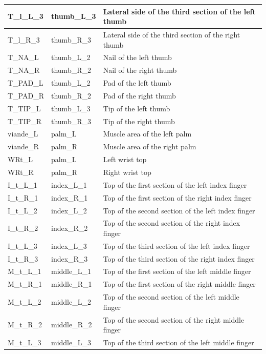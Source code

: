 \documentclass[../main.tex]{subfiles}
\begin{document}
\begin{longtable}{|p{2cm}|p{3cm}|p{5cm}|}
    T\_l\_L\_3 & thumb\_L\_3 & Lateral side of the third section of the left thumb \\ \hline
    T\_l\_R\_3 & thumb\_R\_3 & Lateral side of the third section of the right thumb \\ \hline
    T\_NA\_L & thumb\_L\_2 & Nail of the left thumb \\ \hline
    T\_NA\_R & thumb\_R\_2 & Nail of the right thumb \\ \hline
    T\_PAD\_L & thumb\_L\_2 & Pad of the left thumb \\ \hline
    T\_PAD\_R & thumb\_R\_2 & Pad of the right thumb \\ \hline
    T\_TIP\_L & thumb\_L\_3 & Tip of the left thumb \\ \hline
    T\_TIP\_R & thumb\_R\_3 & Tip of the right thumb \\ \hline
    viande\_L & palm\_L & Muscle area of the left palm \\ \hline
    viande\_R & palm\_R & Muscle area of the right palm \\ \hline
    WRt\_L & palm\_L & Left wrist top \\ \hline
    WRt\_R & palm\_R & Right wrist top \\ \hline
    I\_t\_L\_1 & index\_L\_1 & Top of the first section of the left index finger \\ \hline
    I\_t\_R\_1 & index\_R\_1 & Top of the first section of the right index finger \\ \hline
    I\_t\_L\_2 & index\_L\_2 & Top of the second section of the left index finger \\ \hline
    I\_t\_R\_2 & index\_R\_2 & Top of the second section of the right index finger \\ \hline
    I\_t\_L\_3 & index\_L\_3 & Top of the third section of the left index finger \\ \hline
    I\_t\_R\_3 & index\_R\_3 & Top of the third section of the right index finger \\ \hline
    M\_t\_L\_1 & middle\_L\_1 & Top of the first section of the left middle finger \\ \hline
    M\_t\_R\_1 & middle\_R\_1 & Top of the first section of the right middle finger \\ \hline
    M\_t\_L\_2 & middle\_L\_2 & Top of the second section of the left middle finger \\ \hline
    M\_t\_R\_2 & middle\_R\_2 & Top of the second section of the right middle finger \\ \hline
    M\_t\_L\_3 & middle\_L\_3 & Top of the third section of the left middle finger \\ \hline

\end{longtable}
\end{document}
